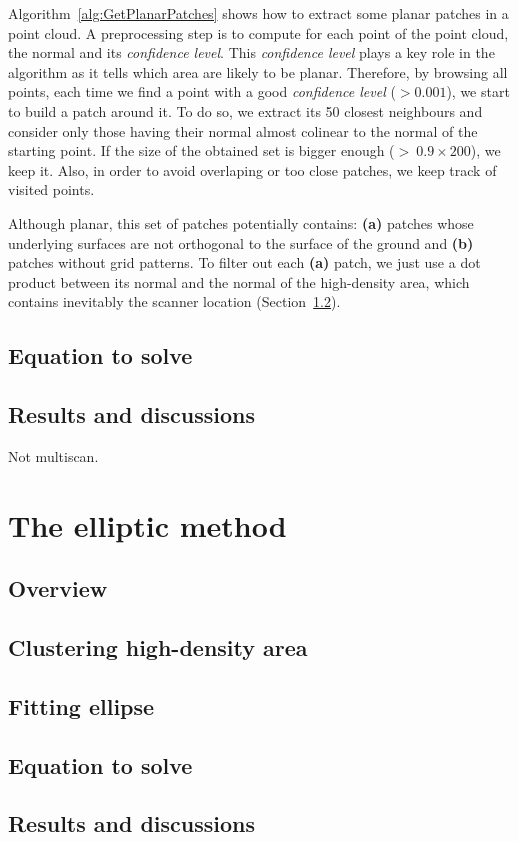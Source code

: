 Algorithm~\ref{alg:GetPlanarPatches} shows how to extract some planar patches in a point cloud. A preprocessing step is to compute for each point of the point cloud, the normal and its \emph{confidence level}. This \emph{confidence level} plays a key role in the algorithm as it tells which area are likely to be planar. Therefore, by browsing all points, each time we find a point with a good \emph{confidence level} ($> 0.001$), we start to build a patch around it. To do so, we extract its 50
closest neighbours and consider only those having their normal almost colinear to the normal of the starting point. If the size of the obtained set is bigger enough ($>\ 0.9 \times 200$), we keep it. Also, in order to avoid overlaping or too close patches, we keep track of visited points.

Although planar, this set of patches potentially contains: \textbf{(a)} patches whose underlying surfaces are not orthogonal to the surface of the ground and \textbf{(b)} patches without grid patterns. To filter out each \textbf{(a)} patch, we just use a dot product between its normal and the normal of the high-density area, which contains inevitably the scanner location (Section~\ref{subsc:highdens}).


\subsection{Equation to solve}
\label{subsc:eq}

\subsection{Results and discussions}
Not multiscan.


\section{The elliptic method}
\label{sc:elliptic}

\subsection{Overview}


\subsection{Clustering high-density area}
\label{subsc:highdens}

\subsection{Fitting ellipse}


\subsection{Equation to solve}


\subsection{Results and discussions}
